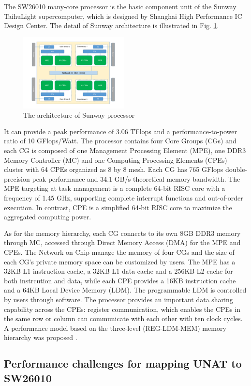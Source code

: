 \documentclass[conference]{IEEEtran}
\begin{document}
The SW26010 many-core processor is the basic component unit of the Sunway TaihuLight supercomputer, which is designed by Shanghai High Performance IC Design Center. The detail of Sunway architecture is illustrated in Fig. \ref{sw26010}.
\begin{figure}[tbp]
\centerline{\includegraphics[width=0.49\textwidth]{sw26010.pdf}}
\caption{The architecture of Sunway processor}
\label{sw26010}
\end{figure}
It can provide a peak performance of 3.06 TFlops and a performance-to-power ratio of 10 GFlops/Watt. The processor contains four Core Groups (CGs) and each CG is composed of one Management Processing Element (MPE), one DDR3 Memory Controller (MC) and one Computing Processing Elements (CPEs) cluster with 64 CPEs organized as 8 by 8 mesh. Each CG has 765 GFlops double-precision peak performance and 34.1 GB/s theoretical memory bandwidth. The MPE targeting at task management is a complete 64-bit RISC core with a frequency of 1.45 GHz, supporting complete interrupt functions and out-of-order execution. In contrast, CPE is a simplified 64-bit RISC core to maximize the aggregated computing power.

As for the memory hierarchy, each CG connects to its own 8GB DDR3 memory through MC, accessed through Direct Memory Access (DMA) for the MPE and CPEs. The Network on Chip manage the memory of four CGs and the size of each CG's private memory space can be customized by users. The MPE has a 32KB L1 instruction cache, a 32KB L1 data cache and a 256KB L2 cache for both instrcution and data, while each CPE provides a 16KB instruction cache and a 64KB Local Device Memory (LDM). The programmable LDM is controlled by users through software. The processor provides an important data sharing capability across the CPEs: register communication, which enables the CPEs in the same row or column can communicate with each other with ten clock cycles. A performance model based on the three-level (REG-LDM-MEM) memory hierarchy was proposed \cite{b16}.

\subsection{Performance challenges for mapping UNAT to SW26010}
\end{document}
